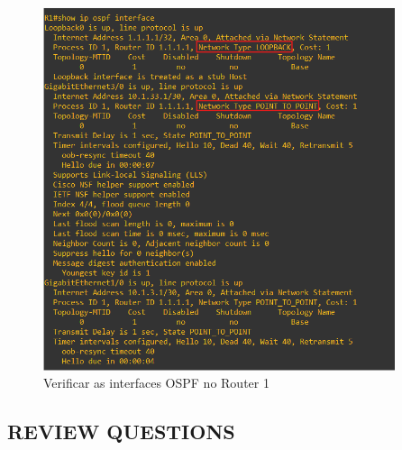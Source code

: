 \documentclass[11pt,english, openright, oneside]{book}
\begin{document}
\begin{itemize}
  \begin{figure}[H]
    \centering
    \includegraphics[width=0.92\textwidth]{imagens/Tarefa2/9.ospf_interface.png}
    \caption{Verificar as interfaces OSPF no Router 1}
    \label{fig:config13}
  \end{figure}
  \vspace{0.2cm}
\end{itemize}

\subsection{REVIEW QUESTIONS}
\vspace{0.2cm}
\end{document}
